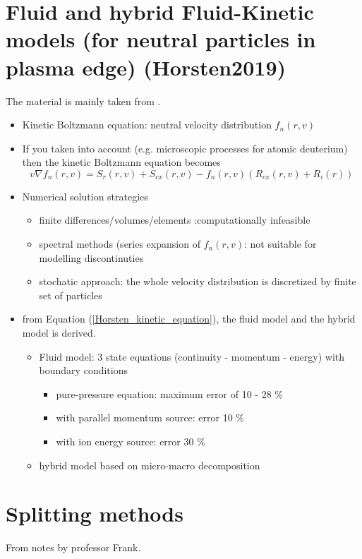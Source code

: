 \documentclass[../main/main.tex]{subfiles}
\begin{document}
\section{Fluid and hybrid Fluid-Kinetic models (for neutral particles in plasma edge) (Horsten2019)}
The material is mainly taken from \cite{HorstenNiels2019}.
\begin{itemize}
\item Kinetic Boltzmann equation: neutral velocity distribution $f_n(r,v)$
\item If you taken into account (e.g. microscopic processes for atomic deuterium) then the kinetic Boltzmann equation becomes 
\begin{equation}
v\nabla f_n(r,v) = S_r(r,v) + S_{cx}(r,v) - f_n(r,v)(R_{cx}(r,v)+R_i(r))
\label{Horsten_kinetic_equation}
\end{equation}

\item Numerical solution strategies
\begin{itemize}
\item finite differences/volumes/elements :computationally infeasible
\item spectral methods (series expansion of $f_n(r,v)$: not suitable for modelling discontinuties
\item stochatic approach: the whole velocity distribution is discretized by finite set of particles
\end{itemize}  

\item from Equation (\ref{Horsten_kinetic_equation}), the fluid model and the hybrid model is derived.
\begin{itemize}
\item Fluid model: 3 state equations (continuity -  momentum - energy) with boundary conditions
\begin{itemize}
\item pure-pressure equation: maximum error of 10 - 28 \% 
\item with parallel momentum source: error 10 \%
\item with ion energy source: error 30 \% 
\end{itemize} 

\item hybrid model based on micro-macro decomposition
\end{itemize}

\end{itemize}


\newpage
\section{Splitting methods}
From notes by professor Frank.
\end{document}
